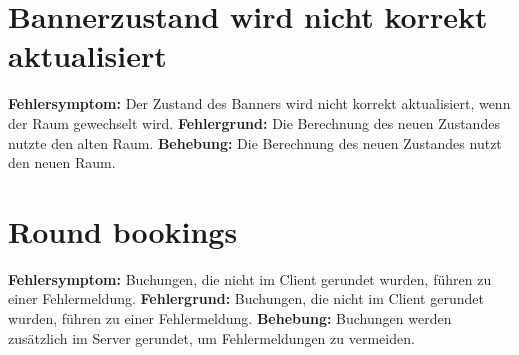 \section{Bannerzustand wird nicht korrekt aktualisiert}
\textbf{Fehlersymptom:} Der Zustand des Banners wird nicht korrekt aktualisiert, wenn der Raum gewechselt wird.
\textbf{Fehlergrund:} Die Berechnung des neuen Zustandes nutzte den alten Raum.
\textbf{Behebung:} Die Berechnung des neuen Zustandes nutzt den neuen Raum.

\section{Round bookings}
\textbf{Fehlersymptom:} Buchungen, die nicht im Client gerundet wurden, führen zu einer Fehlermeldung.
\textbf{Fehlergrund:} Buchungen, die nicht im Client gerundet wurden, führen zu einer Fehlermeldung.
\textbf{Behebung:} Buchungen werden zusätzlich im Server gerundet, um Fehlermeldungen zu vermeiden.

